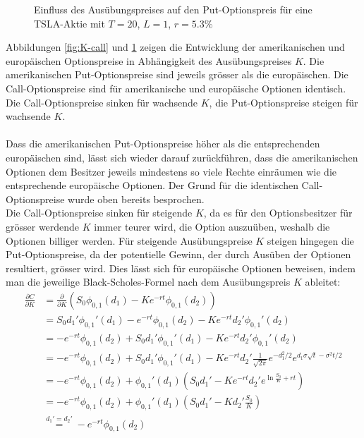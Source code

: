 \documentclass[11pt]{report} %
\newcommand\pd[2]{\displaystyle\frac{\partial #1}{\partial #2}}
\begin{document}
\begin{figure}[H]
    \centering
    \caption{Einfluss des Ausübungspreises auf den Put-Optionspreis für eine TSLA-Aktie mit $T=20$, $L=1$, $r=5.3\%$}
    \label{fig:K-put}
\end{figure}
Abbildungen \ref{fig:K-call} und \ref{fig:K-put} zeigen die Entwicklung der amerikanischen und europäischen Optionspreise in Abhängigkeit des Ausübungspreises $K$. Die amerikanischen Put-Optionspreise sind jeweils grösser als die europäischen. Die Call-Optionspreise sind für amerikanische und europäische Optionen identisch. Die Call-Optionspreise sinken für wachsende $K$, die Put-Optionspreise steigen für wachsende $K$.\\\\Dass die amerikanischen Put-Optionspreise höher als die entsprechenden europäischen sind, lässt sich wieder darauf zurückführen, dass die amerikanischen Optionen dem Besitzer jeweils mindestens so viele Rechte einräumen wie die entsprechende europäische Optionen. Der Grund für die identischen Call-Optionspreise wurde oben bereits besprochen.\\Die Call-Optionspreise sinken für steigende $K$, da es für den Optionsbesitzer für grösser werdende $K$ immer teurer wird, die Option auszuüben, weshalb die Optionen billiger werden. Für steigende Ausübungspreise $K$ steigen hingegen die Put-Optionspreise, da der potentielle Gewinn, der durch Ausüben der Optionen resultiert, grösser wird. Dies lässt sich für europäische Optionen beweisen, indem man die jeweilige Black-Scholes-Formel nach dem Ausübungspreis $K$ ableitet:
    \begin{align*}
    \pd{C}{K}&=\frac{\partial}{\partial K}\left(S_0\phi_{0, 1}(d_1)-Ke^{-rt}\phi_{0, 1}(d_2)\right)\\
    &=S_0d_1'\phi_{0, 1}'(d_1)-e^{-rt}\phi_{0, 1}(d_2)-Ke^{-rt}d_2'\phi_{0,1}'(d_2)\\
    &=-e^{-rt}\phi_{0, 1}(d_2)+S_0d_1'\phi_{0, 1}'(d_1)-Ke^{-rt}d_2'\phi_{0,1}'(d_2)\\
    &=-e^{-rt}\phi_{0, 1}(d_2)+S_0d_1'\phi_{0, 1}'(d_1)-Ke^{-rt}d_2'\frac{1}{\sqrt{2\pi}}e^{-d_1^2/2}e^{d_1\sigma\sqrt{t}-\sigma^2t/2}\\
    &=-e^{-rt}\phi_{0, 1}(d_2)+\phi_{0, 1}'(d_1)\left(S_0d_1'-Ke^{-rt}d_2'e^{\ln{\frac{S_0}{K}}+rt}\right)\\
    &=-e^{-rt}\phi_{0, 1}(d_2)+\phi_{0, 1}'(d_1)\left(S_0d_1'-Kd_2'\frac{S_0}{K}\right)\\
    &\stackrel{d_1'=d_2'}{=}-e^{-rt}\phi_{0, 1}(d_2)
\end{align*}
\end{document}
